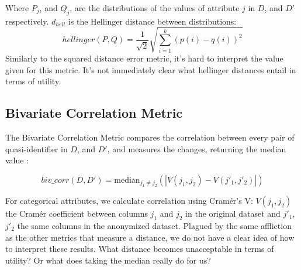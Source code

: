 Where $P_j$, and $Q_j$, are the distributions of the values of attribute $j$ in $D$, and $D'$ respectively. $d_{hell}$ is the Hellinger distance between distributions:
$$
    hellinger(P,Q) = \frac{1}{\sqrt{2}}\sqrt{\sum_{i=1}^k(p(i) - q(i))^2}
$$
Similarly to the squared distance error metric, it's hard to interpret the value given for this metric. It's not immediately clear what hellinger distances entail in terms of utility.


\subsection{Bivariate Correlation Metric}
The Bivariate Correlation Metric compares the correlation between every pair of quasi-identifier in $D$, and $D'$, and measures the changes, returning the median value \cite{hellinger&biv}:

$$biv\_corr(D,D') = \text{median}_{j_1\neq j_2}\left(|V(j_1,j_2) - V(j'_1,j'_2)|\right)$$

For categorical attributes, we calculate correlation using Cramér's V: $V(j_1, j_2)$ the Cramér coefficient between columns $j_1$ and $j_2$ in the original dataset and $j'_1$, $j'_2$ the same columns in the anonymized dataset. Plagued by the same affliction as the other metrics that measure a distance, we do not have a clear idea of how to interpret these results. What distance becomes unacceptable in terms of utility? Or what does taking the median really do for us?
